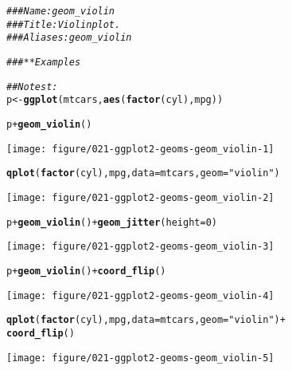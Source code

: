 \documentclass[a4paper,titlepage]{tufte-handout}\usepackage[]{graphicx}\usepackage[]{color}
\makeatletter
\def\maxwidth{ %
  \ifdim\Gin@nat@width>\linewidth
    \linewidth
  \else
    \Gin@nat@width
  \fi
}
\newcommand{\hlnum}[1]{\textcolor[rgb]{0.686,0.059,0.569}{#1}}%
\newcommand{\hlstr}[1]{\textcolor[rgb]{0.192,0.494,0.8}{#1}}%
\newcommand{\hlcom}[1]{\textcolor[rgb]{0.678,0.584,0.686}{\textit{#1}}}%
\newcommand{\hlopt}[1]{\textcolor[rgb]{0,0,0}{#1}}%
\newcommand{\hlstd}[1]{\textcolor[rgb]{0.345,0.345,0.345}{#1}}%
\newcommand{\hlkwb}[1]{\textcolor[rgb]{0.69,0.353,0.396}{#1}}%
\newcommand{\hlkwc}[1]{\textcolor[rgb]{0.333,0.667,0.333}{#1}}%
\newcommand{\hlkwd}[1]{\textcolor[rgb]{0.737,0.353,0.396}{\textbf{#1}}}%
\newenvironment{kframe}{%
 \def\at@end@of@kframe{}%
 \ifinner\ifhmode%
  \def\at@end@of@kframe{\end{minipage}}%
  \begin{minipage}{\columnwidth}%
 \fi\fi%
 \def\FrameCommand##1{\hskip\@totalleftmargin \hskip-\fboxsep
 \colorbox{shadecolor}{##1}\hskip-\fboxsep
     \hskip-\linewidth \hskip-\@totalleftmargin \hskip\columnwidth}%
 \MakeFramed {\advance\hsize-\width
   \@totalleftmargin\z@ \linewidth\hsize
   \@setminipage}}%
 {\par\unskip\endMakeFramed%
 \at@end@of@kframe}
\newenvironment{knitrout}{}{} %
\makeatother
\begin{document}
\begin{knitrout}
\color{fgcolor}\begin{kframe}
\begin{alltt}
\hlcom{### Name: geom_violin}
\hlcom{### Title: Violin plot.}
\hlcom{### Aliases: geom_violin}

\hlcom{### ** Examples}

\hlcom{## No test: }
\hlstd{p} \hlkwb{<-} \hlkwd{ggplot}\hlstd{(mtcars,} \hlkwd{aes}\hlstd{(}\hlkwd{factor}\hlstd{(cyl), mpg))}

\hlstd{p} \hlopt{+} \hlkwd{geom_violin}\hlstd{()}
\end{alltt}
\end{kframe}
\texttt{[image: figure/021-ggplot2-geoms-geom\_violin-1]} 
\begin{kframe}\begin{alltt}
\hlkwd{qplot}\hlstd{(}\hlkwd{factor}\hlstd{(cyl), mpg,} \hlkwc{data} \hlstd{= mtcars,} \hlkwc{geom} \hlstd{=} \hlstr{"violin"}\hlstd{)}
\end{alltt}
\end{kframe}
\texttt{[image: figure/021-ggplot2-geoms-geom\_violin-2]} 
\begin{kframe}\begin{alltt}
\hlstd{p} \hlopt{+} \hlkwd{geom_violin}\hlstd{()} \hlopt{+} \hlkwd{geom_jitter}\hlstd{(}\hlkwc{height} \hlstd{=} \hlnum{0}\hlstd{)}
\end{alltt}
\end{kframe}
\texttt{[image: figure/021-ggplot2-geoms-geom\_violin-3]} 
\begin{kframe}\begin{alltt}
\hlstd{p} \hlopt{+} \hlkwd{geom_violin}\hlstd{()} \hlopt{+} \hlkwd{coord_flip}\hlstd{()}
\end{alltt}
\end{kframe}
\texttt{[image: figure/021-ggplot2-geoms-geom\_violin-4]} 
\begin{kframe}\begin{alltt}
\hlkwd{qplot}\hlstd{(}\hlkwd{factor}\hlstd{(cyl), mpg,} \hlkwc{data} \hlstd{= mtcars,} \hlkwc{geom} \hlstd{=} \hlstr{"violin"}\hlstd{)} \hlopt{+}
  \hlkwd{coord_flip}\hlstd{()}
\end{alltt}
\end{kframe}
\texttt{[image: figure/021-ggplot2-geoms-geom\_violin-5]} 
\begin{kframe}\begin{alltt}

\end{alltt}
\end{kframe}
\end{knitrout}
\end{document}
